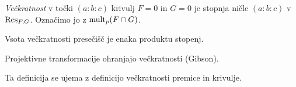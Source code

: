 \begin{definicija}
\emph{Večkratnost} v točki
$(a : b : c)$ krivulj $F = 0$ in $G = 0$ je stopnja ničle
$(a : b : c)$ v $\operatorname{Res}_{F,G}$. Označimo jo z $\operatorname{mult}_p(F \cap G)$.
\end{definicija}

\begin{posledica}
Vsota večkratnosti presečišč je enaka produktu stopenj.
\end{posledica}

\begin{opomba}
Projektivne transformacije ohranjajo večkratnosti (Gibson).
\end{opomba}

\begin{opomba}
Ta definicija se ujema z definicijo večkratnosti premice in
krivulje.
\end{opomba}
